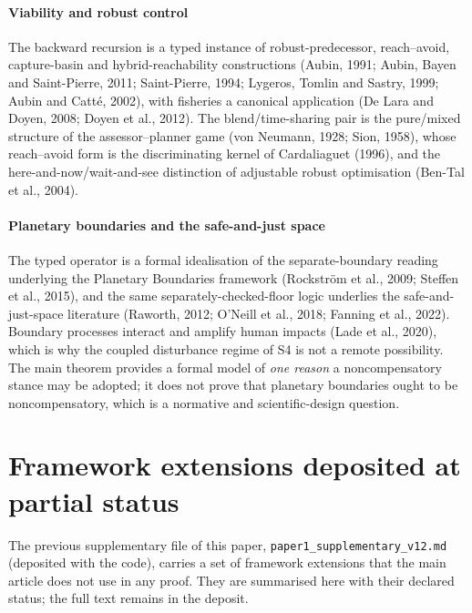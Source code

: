 \paragraph{Viability and robust control} The backward recursion is a typed instance of robust-predecessor, reach--avoid, capture-basin and hybrid-reachability constructions (Aubin, 1991; Aubin, Bayen and Saint-Pierre, 2011; Saint-Pierre, 1994; Lygeros, Tomlin and Sastry, 1999; Aubin and Catt\'e, 2002), with fisheries a canonical application (De Lara and Doyen, 2008; Doyen et al., 2012). The blend/time-sharing pair is the pure/mixed structure of the assessor--planner game (von Neumann, 1928; Sion, 1958), whose reach--avoid form is the discriminating kernel of Cardaliaguet (1996), and the here-and-now/wait-and-see distinction of adjustable robust optimisation (Ben-Tal et al., 2004).

\paragraph{Planetary boundaries and the safe-and-just space} The typed operator is a formal idealisation of the separate-boundary reading underlying the Planetary Boundaries framework (Rockstr\"om et al., 2009; Steffen et al., 2015), and the same separately-checked-floor logic underlies the safe-and-just-space literature (Raworth, 2012; O'Neill et al., 2018; Fanning et al., 2022). Boundary processes interact and amplify human impacts (Lade et al., 2020), which is why the coupled disturbance regime of S4 is not a remote possibility. The main theorem provides a formal model of \emph{one reason} a noncompensatory stance may be adopted; it does not prove that planetary boundaries ought to be noncompensatory, which is a normative and scientific-design question.

\section{Framework extensions deposited at partial status}\label{si:framework}

The previous supplementary file of this paper, \texttt{paper1\_supplementary\_v12.md} (deposited with the code), carries a set of framework extensions that the main article does not use in any proof. They are summarised here with their declared status; the full text remains in the deposit.

